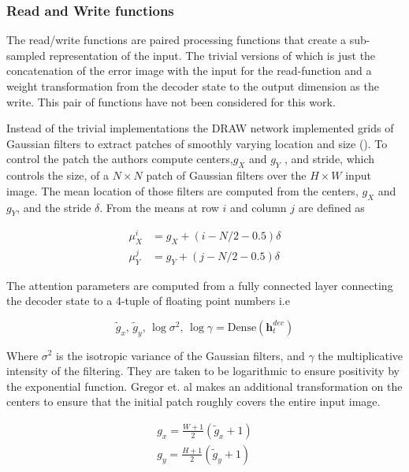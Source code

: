  \subsubsection{Read and Write functions}

 The read/write functions are paired processing functions that create a sub-sampled representation of the input. The trivial versions of which is just the concatenation of the error image with the input for the read-function and a weight transformation from the decoder state to the output dimension as the write. This pair of functions have not been considered for this work. 

 Instead of the trivial implementations the DRAW network implemented grids of Gaussian filters to extract patches of smoothly varying location and size (\cite{Gregor2015}). To control the patch the authors compute centers,$g_X$ and $g_Y$ , and stride, which controls the size, of a $N \times N$ patch of Gaussian filters over the $H \times W$ input image. The mean location of those filters are computed from the centers, $g_X$ and $g_Y$, and the stride $\delta$. From \citet{Gregor2015} the means at row $i$ and column $j$ are defined as 

 \begin{align}
 \mu_X^i &= g_X + (i - N/2-0.5)\delta \\
 \mu_Y^j &= g_Y + (j - N/2-0.5)\delta
 \end{align}

\noindent The attention parameters are computed from a fully connected layer connecting the decoder state to a 4-tuple of floating point numbers i.e

\begin{equation}
\tilde{g}_x, \,\tilde{g}_y, \, \log \sigma^2, \, \log \gamma = \text{Dense} (\mathbf{h}_t^{dec})
\end{equation}

\noindent Where $\sigma^2$ is the isotropic variance of the Gaussian filters, and $\gamma$ the multiplicative intensity of the filtering. They are taken to be logarithmic to ensure positivity by the exponential function. Gregor et. al makes an additional transformation on the centers to ensure that the initial patch roughly covers the entire input image. 

\begin{align}
g_x = \frac{W +1 }{2} (\tilde{g}_x +1 ) \\
g_y = \frac{H +1 }{2} (\tilde{g}_y +1 ) \\
\end{align}

